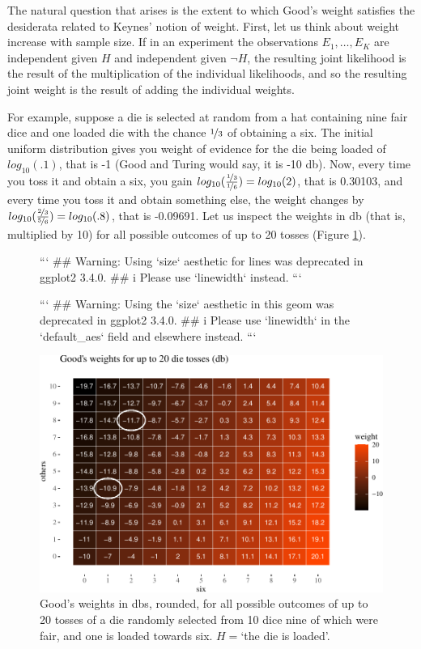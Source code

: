 \documentclass[
  10pt,
  dvipsnames,enabledeprecatedfontcommands]{scrartcl}
\begin{document}
The natural question that arises is the extent to which Good's weight
satisfies the desiderata related to Keynes' notion of weight. First, let
us think about weight increase with sample size. If in an experiment the
observations \(E_1, \dots, E_K\) are independent given \(H\) and
independent given \(\neg H\), the resulting joint likelihood is the
result of the multiplication of the individual likelihoods, and so the
resulting joint weight is the result of adding the individual weights.

For example, suppose a die is selected at random from a hat containing
nine fair dice and one loaded die with the chance \(\nicefrac{1}{3}\) of
obtaining a six. The initial uniform distribution gives you weight of
evidence for the die being loaded of \(log_{10}(.1)\), that is -1 (Good
and Turing would say, it is -10 db). Now, every time you toss it and
obtain a six, you gain
\(log_{10}(\frac{\nicefrac{1}{3}}{\nicefrac{1}{6}})= log_{10}(2)\), that
is 0.30103, and every time you toss it and obtain something else, the
weight changes by
\(log_{10}(\frac{\nicefrac{2}{3}}{\nicefrac{5}{6}})= log_{10}(.8)\),
that is -0.09691. Let us inspect the weights in db (that is, multiplied
by 10) for all possible outcomes of up to 20 tosses (Figure
\ref{fig:goodWeight}).

\begin{figure}

```
## Warning: Using `size` aesthetic for lines was deprecated in ggplot2 3.4.0.
## i Please use `linewidth` instead.
```

```
## Warning: Using the `size` aesthetic in this geom was deprecated in ggplot2 3.4.0.
## i Please use `linewidth` in the `default_aes` field and elsewhere instead.
```



\begin{center}\includegraphics[width=1\linewidth]{imprecision_weight_files/figure-latex/goodWEights-1} \end{center}
\caption{Good's weights in dbs, rounded, for all possible outcomes of up to 20 tosses of a die randomly selected from 10 dice nine of which were fair, and one is  loaded towards six. $H=$`the die is loaded'.}
\label{fig:goodWeight}
\end{figure}
\end{document}
